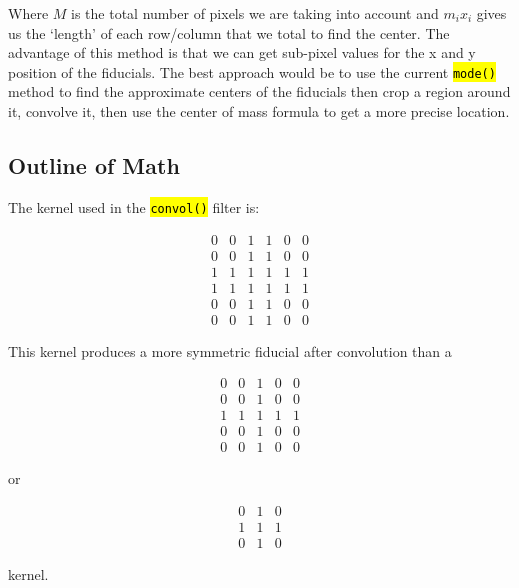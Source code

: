 \documentclass[10pt]{scrartcl}
\begin{document}
    Where $M$ is the total number of pixels we are taking into account and $m_ix_i$ gives us the `length' of each row/column that we total to find the center. The advantage of this method is that we can get sub-pixel values for the x and y position of the fiducials. The best approach would be to use the current \hl{\texttt{mode()}} method to find the approximate centers of the fiducials then crop a region around it, convolve it, then use the center of mass formula to get a more precise location.

\subsection{Outline of Math} %
\label{sub:outline_of_math}
    The kernel used in the \hl{\texttt{convol()}} filter is:

    \[ \begin{array}{cccccc}
    0 & 0 & 1 & 1 & 0 & 0 \\
    0 & 0 & 1 & 1 & 0 & 0 \\
    1 & 1 & 1 & 1 & 1 & 1 \\
    1 & 1 & 1 & 1 & 1 & 1 \\
    0 & 0 & 1 & 1 & 0 & 0 \\
    0 & 0 & 1 & 1 & 0 & 0 \end{array}\] 

    This kernel produces a more symmetric fiducial after convolution than a 

    \[ \begin{array}{ccccc}
    0 & 0 & 1 & 0 & 0 \\
    0 & 0 & 1 & 0 & 0 \\
    1 & 1 & 1 & 1 & 1 \\
    0 & 0 & 1 & 0 & 0 \\
    0 & 0 & 1 & 0 & 0 \end{array}\] 

    or

    \[ \begin{array}{ccc}
    0 & 1 & 0 \\
    1 & 1 & 1 \\
    0 & 1 & 0 \end{array}\] 

    kernel.
\end{document}
